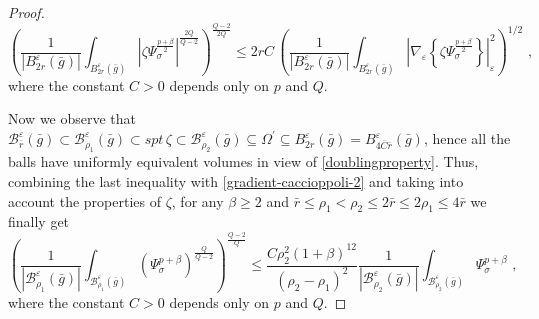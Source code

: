 \documentclass[10pt]{amsart}
\numberwithin{equation}{section}
\theoremstyle{definition}
\begin{document}
\begin{proof}
  \[
	\left( \frac{1}{|B^\varepsilon_{2r}(\bar{g})| }\int_{B^\varepsilon_{2r}(\bar{g})} \left|  \zeta \Psi_\sigma^{\frac{p+\beta}2}\right|^{\frac{2Q}{Q-2}} \right)^{\frac{Q-2}{2Q}} \leq 2r C \,  \left( \frac{1}{|B^\varepsilon_{2r}(\bar{g})| }\int_{B^\varepsilon_{2r}(\bar{g})}  \left| \nabla_\varepsilon  \left\{ \zeta \Psi_\sigma^{\frac{p+\beta}2} \right\} \right|_\varepsilon^2   \right)^{1/2}\, \, ,
\]
where the constant $C>0$ depends only on $p$ and $Q$. 

Now we observe that $\mathcal{B}_{ \bar{r}}^\varepsilon(\bar{g}) \subset \mathcal{B}^\varepsilon_{\rho_1} (\bar{g}) \subset  spt \, \zeta \subset \mathcal{B}_{ \rho_2}^\varepsilon(\bar{g})  \subseteq \Omega^\prime \subseteq B^\varepsilon_{2r}(\bar{g})=B^\varepsilon_{4 \bar{C} \bar{r}}(\bar{g})$, hence all the balls have uniformly equivalent volumes in view of \eqref{doublingproperty}. Thus, combining the last inequality with \eqref{gradient-caccioppoli-2} and taking into account the properties of $\zeta$, for any $\beta \geq 2$ and $\bar{r}\leq \rho_1<\rho_2 \leq 2 \bar{r}\leq 2 \rho_1  \leq 4\bar{r}$ we finally get
\begin{equation}
\label{reverse-holder}
\left(  \frac{1}{|\mathcal{B}^\varepsilon_{\rho_1}(\bar{g})|}\int_{\mathcal{B}^\varepsilon_{\rho_1}(\bar{g})}  \left( \Psi_\sigma^{p+\beta} \right)^{\frac{Q}{Q-2}} \right)^{\frac{Q-2}{Q}} \leq \frac{C \rho_2^2(1+\beta)^{12}}{(\rho_2-\rho_1)^2}   \frac{1}{|\mathcal{B}^\varepsilon_{\rho_2}(\bar{g})|}\int_{ \mathcal{B}_{ \rho_2}^\varepsilon(\bar{g})} \Psi_\sigma^{p+\beta} \, 
\, ,
\end{equation}
where the constant $C>0$ depends only on $p$ and $Q$.


\end{proof}
\end{document}
